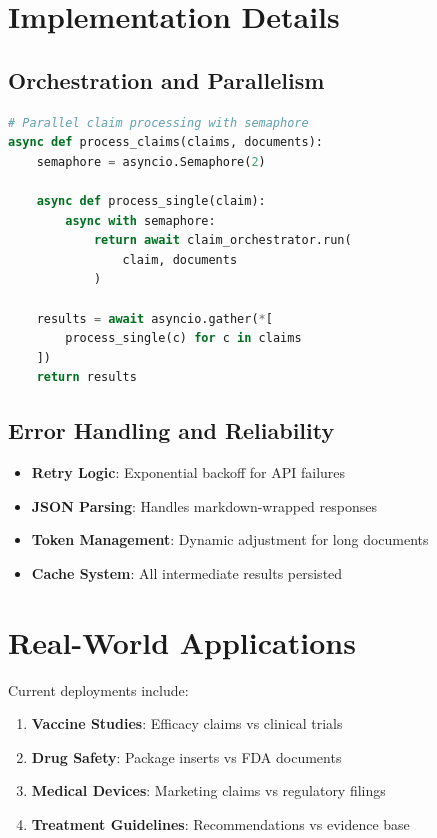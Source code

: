 \documentclass[11pt]{article}
\begin{document}
\section{Implementation Details}

\subsection{Orchestration and Parallelism}

\begin{lstlisting}[language=Python]
# Parallel claim processing with semaphore
async def process_claims(claims, documents):
    semaphore = asyncio.Semaphore(2)
    
    async def process_single(claim):
        async with semaphore:
            return await claim_orchestrator.run(
                claim, documents
            )
    
    results = await asyncio.gather(*[
        process_single(c) for c in claims
    ])
    return results
\end{lstlisting}

\subsection{Error Handling and Reliability}

\begin{itemize}[leftmargin=*,topsep=0pt,itemsep=0pt]
\item \textbf{Retry Logic}: Exponential backoff for API failures
\item \textbf{JSON Parsing}: Handles markdown-wrapped responses
\item \textbf{Token Management}: Dynamic adjustment for long documents
\item \textbf{Cache System}: All intermediate results persisted
\end{itemize}

\section{Real-World Applications}

Current deployments include:
\begin{enumerate}[leftmargin=*,topsep=0pt,itemsep=0pt]
\item \textbf{Vaccine Studies}: Efficacy claims vs clinical trials
\item \textbf{Drug Safety}: Package inserts vs FDA documents
\item \textbf{Medical Devices}: Marketing claims vs regulatory filings
\item \textbf{Treatment Guidelines}: Recommendations vs evidence base
\end{enumerate}
\end{document}
